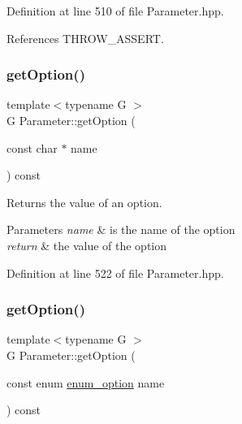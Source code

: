 Definition at line 510 of file Parameter.\+hpp.



References T\+H\+R\+O\+W\+\_\+\+A\+S\+S\+E\+RT.

\mbox{\label{classParameter_a7ea710c709e4ccdc7506111ad76f0cd8}} 
\subsubsection{\texorpdfstring{get\+Option()}{getOption()}\hspace{0.1cm}{\footnotesize\ttfamily [4/8]}}
{\footnotesize\ttfamily template$<$typename G $>$ \\
G Parameter\+::get\+Option (\begin{DoxyParamCaption}\item[{const char $\ast$}]{name }\end{DoxyParamCaption}) const\hspace{0.3cm}{\ttfamily [inline]}}



Returns the value of an option. 


\begin{DoxyParams}{Parameters}
{\em name} & is the name of the option \\
\hline
{\em return} & the value of the option \\
\hline
\end{DoxyParams}


Definition at line 522 of file Parameter.\+hpp.

\mbox{\label{classParameter_a79238fd1f5016e22b45f7db967faaa1a}} 
\subsubsection{\texorpdfstring{get\+Option()}{getOption()}\hspace{0.1cm}{\footnotesize\ttfamily [5/8]}}
{\footnotesize\ttfamily template$<$typename G $>$ \\
G Parameter\+::get\+Option (\begin{DoxyParamCaption}\item[{const enum \hyperlink{Parameter_8hpp_a6d9441db52e537f5588658b218875976}{enum\+\_\+option}}]{name }\end{DoxyParamCaption}) const\hspace{0.3cm}{\ttfamily [inline]}}



